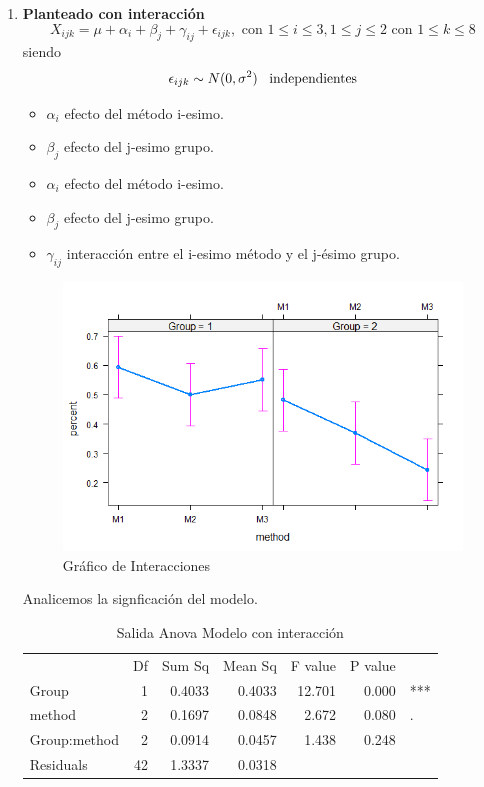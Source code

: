 \documentclass[a4paper,12pt]{article}
\begin{document}
\begin{enumerate}
	
	\item \textcolor{BlueGreen}{\textbf{Planteado con interacción}}
	\[X_{ijk}=\mu+\alpha_i+\beta_j+\gamma_{ij}+\epsilon_{ijk} ,\,\, \text{con} \,\, 1 \leq i \leq 3, 1 \leq j \leq 2 \,\, \text{con} \,\, 1 \leq k \leq 8
	\]
	siendo
	\[
	\epsilon_{ijk}\sim N(0,\sigma^2) \hspace{0.3cm} \text{independientes}
	\]
	\begin{itemize}
		\item $\alpha_i$ efecto del método i-esimo.
		\item $\beta_j$ efecto del j-esimo grupo.
	\end{itemize}
	\begin{itemize}
		\item $\alpha_i$ efecto del método i-esimo.
		\item $\beta_j$ efecto del j-esimo grupo.
		\item $\gamma_{ij}$ interacción entre el i-esimo método y el j-ésimo grupo.
	\end{itemize}

\begin{figure}[H]
	\centering
	\caption{Gráfico de Interacciones}
	\label{p4}
	\includegraphics[scale=0.7]{plot4.png}
\end{figure}	

Analicemos la signficación del modelo.
\begin{table}[H]
	\centering
	\caption{Salida Anova Modelo con interacción}
	\begin{tabular}{lrrrrrr}
		& \multicolumn{1}{l}{Df} & \multicolumn{1}{l}{Sum Sq} & \multicolumn{1}{l}{Mean Sq} & \multicolumn{1}{l}{F value} & \multicolumn{1}{l}{P value} &  \\
		Group & 1     & 0.4033 & 0.4033 & 12.701 & 0.000 & \multicolumn{1}{l}{***} \\
		method & 2     & 0.1697 & 0.0848 & 2.672 & 0.080 & \multicolumn{1}{l}{.} \\
		Group:method & 2     & 0.0914 & 0.0457 & 1.438 & 0.248 &  \\
		Residuals & 42    & 1.3337 & 0.0318 &       &       &  \\
	\end{tabular}%
	\label{tab:anova1}%
\end{table}%


\end{enumerate}
\end{document}
